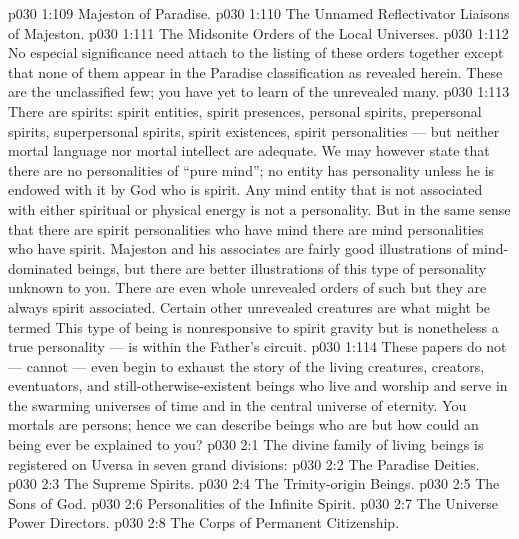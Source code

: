 \vs p030 1:109 Majeston of Paradise.
\vs p030 1:110 The Unnamed Reflectivator Liaisons of Majeston.
\vs p030 1:111 The Midsonite Orders of the Local Universes.
\vs p030 1:112 \pc No especial significance need attach to the listing of these orders together except that none of them appear in the Paradise classification as revealed herein. These are the unclassified few; you have yet to learn of the unrevealed many.
\vs p030 1:113 There are spirits: spirit entities, spirit presences, personal spirits, prepersonal spirits, superpersonal spirits, spirit existences, spirit personalities --- but neither mortal language nor mortal intellect are adequate. We may however state that there are no personalities of “pure mind”; no entity has personality unless he is endowed with it by God who is spirit. Any mind entity that is not associated with either spiritual or physical energy is not a personality. But in the same sense that there are spirit personalities who have mind there are mind personalities who have spirit. Majeston and his associates are fairly good illustrations of mind\hyp{}dominated beings, but there are better illustrations of this type of personality unknown to you. There are even whole unrevealed orders of such  but they are always spirit associated. Certain other unrevealed creatures are what might be termed  This type of being is nonresponsive to spirit gravity but is nonetheless a true personality --- is within the Father’s circuit.
\vs p030 1:114 \pc These papers do not --- cannot --- even begin to exhaust the story of the living creatures, creators, eventuators, and still\hyp{}otherwise\hyp{}existent beings who live and worship and serve in the swarming universes of time and in the central universe of eternity. You mortals are persons; hence we can describe beings who are  but how could an  being ever be explained to you?
\vs p030 2:1 The divine family of living beings is registered on Uversa in seven grand divisions:
\vs p030 2:2 \bibnobreakspace The Paradise Deities.
\vs p030 2:3 \bibnobreakspace The Supreme Spirits.
\vs p030 2:4 \bibnobreakspace The Trinity\hyp{}origin Beings.
\vs p030 2:5 \bibnobreakspace The Sons of God.
\vs p030 2:6 \bibnobreakspace Personalities of the Infinite Spirit.
\vs p030 2:7 \bibnobreakspace The Universe Power Directors.
\vs p030 2:8 \bibnobreakspace The Corps of Permanent Citizenship.
